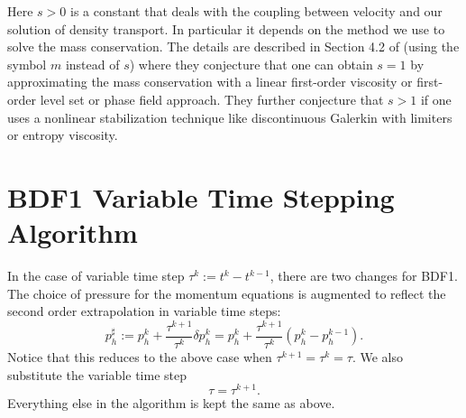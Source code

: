 \documentclass[letterpaper]{erdc}
\begin{document}
\begin{remark}
  Here $s>0$ is a constant that deals with the coupling between velocity and our solution of density transport.  In particular it depends on the method we use to solve the mass conservation.  The details are described in Section 4.2 of \cite{guermond2011error} (using the symbol $m$ instead of $s$) where they conjecture that one can obtain $s=1$ by approximating the mass conservation with a linear first-order viscosity or first-order level set or phase field approach.  They further conjecture that $s>1$ if one uses a nonlinear stabilization technique like discontinuous Galerkin with limiters or entropy viscosity.  
\end{remark}


%
%
\section{BDF1 Variable Time Stepping Algorithm}\label{sec:BDF1VariableTimeSteppingAlgorithm}
In the case of variable time step  $\tau^{k} := t^{k}-t^{k-1}$, there are two changes for BDF1.  The choice of pressure for the momentum equations is augmented to reflect the second order extrapolation in variable time steps:
\begin{equation}
  p^{\sharp}_h := p_h^{k} + \frac{\tau^{k+1}}{\tau^{k}}\delta p_h^{k} = p_h^{k} + \frac{\tau^{k+1}}{\tau^{k}}\left( p_h^{k} - p_h^{k-1} \right).
\end{equation}
Notice that this reduces to the above case when $\tau^{k+1}=\tau^{k} = \tau$.  We also substitute the variable time step
\begin{equation}
  \tau =\tau^{k+1}.
\end{equation}
Everything else in the algorithm is kept the same as above.
\end{document}
